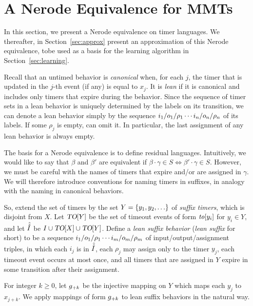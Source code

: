 \section{A Nerode Equivalence for MMTs}
\label{sec:bj-nerode}

In this section, we present a Nerode equivalence on timer languages.
We thereafter, in Section~\ref{sec:approx} present an approximation of this
Nerode equivalence, tobe used as a basis for the learning algorithm in
Section~\ref{sec:learning}.

Recall that an untimed behavior is \emph{canonical} when, for each $j$,
the timer that is updated in the $j$-th event (if any) is equal to $x_j$.
It is {\em lean} if it is canonical and
includes only timers that expire during the behavior. 
Since the sequence of timer sets in a lean behavior is
uniquely determined by the labels on its transition, we can
denote a lean behavior simply by the sequence
$i_1/o_1/\rho_1 \cdots i_n/o_n/\rho_n$ of its labels.
If some $\rho_j$ is empty, can omit it. In particular, the last assignment of
any lean behavior is always empty.

The basis for a Nerode equivalence is to define residual languages.
Intuitively, we would like to say that $\beta$ and $\beta'$ are equivalent if
$\beta \cdot \gamma \in S \iff \beta' \cdot \gamma \in S$. However, we must
be careful with the names of timers that expire and/or are assigned in $\gamma$.
We will therefore introduce conventions for naming timers in suffixes, in
analogy with the naming in canonical behaviors.

So, extend the set of timers by the set $Y = \lbrace y_1,y_2,\ldots\rbrace$ of
{\em suffix timers}, which is disjoint from $X$.
Let $\mbox{\sl TO}[Y]$ be the set of timeout events of form
$\mathit{to}[y_i]$ for $y_i \in Y$, and let
$\hat{\hat{I}}$ be $I \cup \mbox{\sl TO}[X] \cup \mbox{\sl TO}[Y]$.
Define a {\em lean suffix behavior} ({\em lean suffix} for short)
to be a sequence
$i_1/o_1/\rho_1 \cdots i_m/o_m/\rho_m$ of input/output/assignment triples,
in which each $i_j$ is in $\hat{\hat{I}}$, 
each $\rho_j$ may assign only to the timer $y_j$,
each timeout event occurs at most once,
and all timers that are assigned in $Y$ expire in some transition
after their assignment.

For integer $k \geq 0$, let $g_{+{k}}$ be the injective mapping on
$Y$ which maps each $y_j$ to $x_{j+k}$.  We apply mappings of form
$g_{+{k}}$ to lean suffix behaviors in the natural way.

